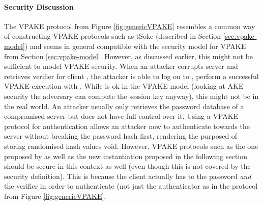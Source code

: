 \paragraph{Security Discussion}
The \ac{VPAKE} protocol from Figure \ref{fig:genericVPAKE} resembles a common way of constructing \ac{VPAKE} protocols such as tSoke (described in Section \ref{sec:vpake-model}) and seems in general compatible with the security model for \ac{VPAKE} from Section \ref{sec:vpake-model}.
However, as discussed earlier, this might not be sufficient to model \ac{VPAKE} security.
When an attacker corrupts server \Server and retrieves verifier \ver for client \Client, the attacker is able to log on to \Server, \ie perform a successful \ac{VPAKE} execution with \Server.
While is ok in the \ac{VPAKE} model (looking at \ac{AKE} security the adversary can compute the session key anyway), this might not be in the real world.
An attacker usually only retrieves the password database of a compromised server but does not have full control over it.
Using a \ac{VPAKE} protocol for authentication allows an attacker now to authenticate towards the server without breaking the password hash first, \ie rendering the purposed of storing randomised hash values void.
However, \ac{VPAKE} protocols such as the one proposed by \citet{BenhamoudaP13} as well as the new instantiation proposed in the following section should be secure in this context as well (even though this is not covered by the security definition).
This is because the client actually has to the password \emph{and} the verifier in order to authenticate (not just the authenticator as in the protocol from Figure \ref{fig:genericVPAKE}.

